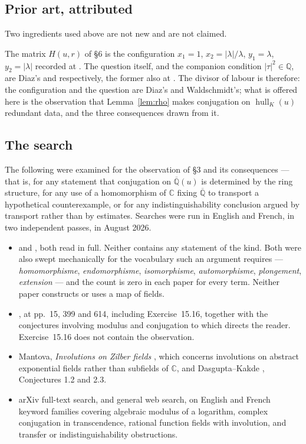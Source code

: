 \documentclass[11pt]{article}
\theoremstyle{definition}
\theoremstyle{remark}
\newcommand{\C}{\mathbb{C}}
\newcommand{\Q}{\mathbb{Q}}
\newcommand{\Qbar}{\overline{\Q}}
\newcommand{\hull}{\operatorname{hull}}
\begin{document}
\subsection*{Prior art, attributed}

Two ingredients used above are not new and are not claimed.

The matrix $H(u,r)$ of \S6 is the configuration $x_1=1$, $x_2=|\lambda|/\lambda$,
$y_1=\lambda$, $y_2=|\lambda|$ recorded at \cite[p.~15]{Waldschmidt2000}. The
question itself, and the companion condition $|\tau|^{2}\in\Q$, are Diaz's
\cite[\S5.1, p.~550]{Diaz2004} and \cite[assertion (4-1), p.~237]{Diaz1997}
respectively, the former also at \cite[p.~399]{Waldschmidt2000}. The divisor of
labour is therefore: the configuration and the question are Diaz's and
Waldschmidt's; what is offered here is the observation that
Lemma~\ref{lem:rho} makes conjugation on $\hull_K(u)$ redundant data, and the
three consequences drawn from it.

\subsection*{The search}

The following were examined for the observation of \S3 and its consequences ---
that is, for any statement that conjugation on $\Qbar(u)$ is determined by the
ring structure, for any use of a homomorphism of $\C$ fixing $\Qbar$ to transport
a hypothetical counterexample, or for any indistinguishability conclusion argued
by transport rather than by estimates. Searches were run in English and French,
in two independent passes, in August 2026.

\begin{itemize}
\item \cite{Diaz2004} and \cite{Diaz1997}, both read in full. Neither contains
      any statement of the kind. Both were also swept mechanically for the
      vocabulary such an argument requires --- \emph{homomorphisme},
      \emph{endomorphisme}, \emph{isomorphisme}, \emph{automorphisme},
      \emph{plongement}, \emph{extension} --- and the count is zero in each
      paper for every term. Neither paper constructs or uses a map of fields.
\item \cite{Waldschmidt2000}, at pp.~15, 399 and 614, including
      Exercise~15.16, together with the conjectures involving modulus and
      conjugation to which \cite[p.~551]{Diaz2004} directs the reader.
      Exercise~15.16 does not contain the observation.
\item Mantova, \emph{Involutions on Zilber fields} \cite{Mantova2011}, which
      concerns involutions on abstract exponential fields rather than
      subfields of $\C$, and Dasgupta--Kakde \cite{DasguptaKakde2024},
      Conjectures 1.2 and 2.3.
\item arXiv full-text search, and general web search, on English and French
      keyword families covering algebraic modulus of a logarithm, complex
      conjugation in transcendence, rational function fields with involution,
      and transfer or indistinguishability obstructions.
\end{itemize}
\end{document}
